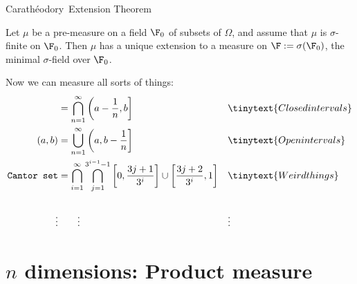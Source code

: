 \documentclass[10pt]{beamer}
\newcommand{\Caratheodory}{Carath\'eodory}
\begin{document}
\begin{frame}{\Caratheodory~Extension Theorem}
\begin{theorem} Let $\mu$ be a pre-measure on a field $\F_0$ of subsets of $\Omega$, and assume that $\mu$ is $\sigma$-finite on $\F_0$.  Then $\mu$ has a unique extension to a measure on $\F := \sigma(\F_0)$, the minimal $\sigma$-field over $\F_0$. 
 \label{thm:caratheodory_extension}
\end{theorem}

\begin{block}{Now we can measure all sorts of things:}
\begin{align*}
	[a,b] &= \bigcap_{n=1}^\infty \bigg(a-\frac{1}{n}, b\bigg] && \tinytext{Closed intervals} \\
	(a,b) &= \bigcup_{n=1}^\infty \bigg(a, b-\frac{1}{n}\bigg] && \tinytext{Open intervals} \\
	\texttt{Cantor set} &= \bigcap_{i=1}^\infty\bigcap_{j=1}^{3^{i-1}-1}\left[0,\frac{3j+1}{3^i}\right]\cup \left[\frac{3j+2}{3^i}, 1\right]&& \tinytext{Weird things} \\
	\\
	\vdots & \quad \quad  \vdots && \vdots \\
\end{align*}

\end{block}
	
\end{frame}




\section{$n$ dimensions: Product measure}
\end{document}
